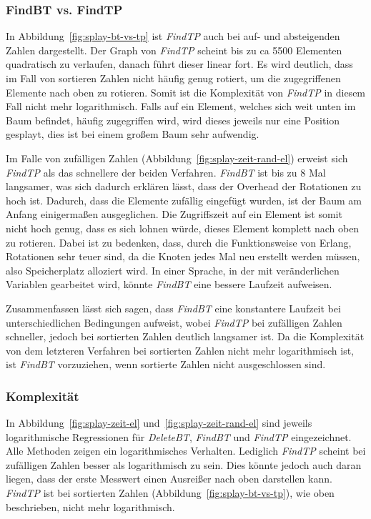 \subsubsection{FindBT vs. FindTP}
In Abbildung~\ref{fig:splay-bt-vs-tp} ist \textit{FindTP} auch bei auf- und absteigenden Zahlen
dargestellt.
Der Graph von \textit{FindTP} scheint bis zu ca 5500 Elementen quadratisch zu verlaufen, danach
führt dieser linear fort.
Es wird deutlich, dass im Fall von sortieren Zahlen nicht häufig genug rotiert, um
die zugegriffenen Elemente nach oben zu rotieren.
Somit ist die Komplexität von \textit{FindTP} in diesem Fall nicht mehr logarithmisch.
Falls auf ein Element, welches sich weit unten im Baum befindet, häufig zugegriffen wird, wird
dieses jeweils nur eine Position gesplayt, dies ist bei einem großem Baum sehr aufwendig.

Im Falle von zufälligen Zahlen (Abbildung~\ref{fig:splay-zeit-rand-el}) erweist sich \textit{FindTP}
als das schnellere der beiden Verfahren.
\textit{FindBT} ist bis zu 8 Mal langsamer, was sich dadurch erklären lässt, dass der Overhead
der Rotationen zu hoch ist.
Dadurch, dass die Elemente zufällig eingefügt wurden, ist der Baum am Anfang einigermaßen
ausgeglichen.
Die Zugriffszeit auf ein Element ist somit nicht hoch genug, dass es sich lohnen würde,
dieses Element komplett nach oben zu rotieren.
Dabei ist zu bedenken, dass, durch die Funktionsweise von Erlang, Rotationen sehr teuer sind, da
die Knoten jedes Mal neu erstellt werden müssen, also Speicherplatz alloziert wird.
In einer Sprache, in der mit veränderlichen Variablen gearbeitet wird, könnte \textit{FindBT}
eine bessere Laufzeit aufweisen.

Zusammenfassen lässt sich sagen, dass \textit{FindBT} eine konstantere Laufzeit bei
unterschiedlichen Bedingungen aufweist, wobei \textit{FindTP} bei zufälligen Zahlen
schneller, jedoch bei sortierten Zahlen deutlich langsamer ist.
Da die Komplexität von dem letzteren Verfahren bei sortierten Zahlen nicht mehr
logarithmisch ist, ist \textit{FindBT} vorzuziehen, wenn sortierte Zahlen nicht ausgeschlossen sind.

\subsubsection{Komplexität}
In Abbildung~\ref{fig:splay-zeit-el} und~\ref{fig:splay-zeit-rand-el} sind jeweils
logarithmische Regressionen für \textit{DeleteBT}, \textit{FindBT} und \textit{FindTP} eingezeichnet.
Alle Methoden zeigen ein logarithmisches Verhalten.
Lediglich \textit{FindTP} scheint bei zufälligen Zahlen besser als logarithmisch zu sein.
Dies könnte jedoch auch daran liegen, dass der erste Messwert einen Ausreißer nach oben
darstellen kann.
\textit{FindTP} ist bei sortierten Zahlen (Abbildung~\ref{fig:splay-bt-vs-tp}), wie oben
beschrieben, nicht mehr logarithmisch.

